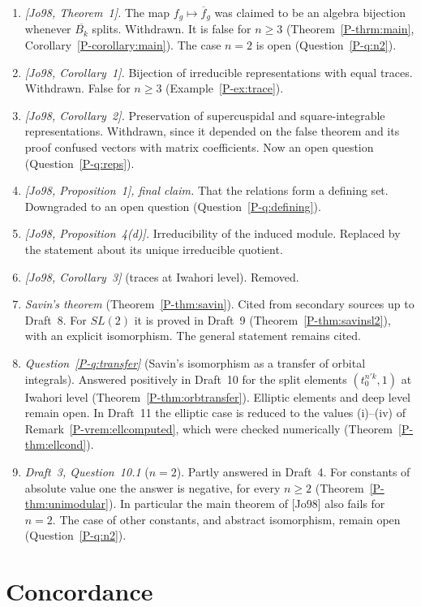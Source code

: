 \documentclass[12pt,letterpaper]{amsart}
\newcommand{\fbar}{\overline{f}}
\begin{document}
\begin{enumerate}[leftmargin=1.5em]
\item \emph{[Jo98, Theorem~1].} The map $f_g\mapsto\fbar_g$ was
claimed to be an algebra bijection whenever $\overline{B_k}$ splits.
Withdrawn. It is false for $n\geq 3$
(Theorem~\ref{P-thrm:main}, Corollary~\ref{P-corollary:main}). The case
$n=2$ is open (Question~\ref{P-q:n2}).
\item \emph{[Jo98, Corollary~1].} Bijection of irreducible
representations with equal traces. Withdrawn. False for $n\geq 3$
(Example~\ref{P-ex:trace}).
\item \emph{[Jo98, Corollary~2].} Preservation of supercuspidal and
square-integrable representations. Withdrawn, since it depended on the
false theorem and its proof confused vectors with matrix coefficients.
Now an open question (Question~\ref{P-q:reps}).
\item \emph{[Jo98, Proposition~1], final claim.} That the relations
form a defining set. Downgraded to an open question
(Question~\ref{P-q:defining}).
\item \emph{[Jo98, Proposition~4(d)].} Irreducibility of the induced
module. Replaced by the statement about its unique irreducible
quotient.
\item \emph{[Jo98, Corollary~3]} (traces at Iwahori level). Removed.
\item \emph{Savin's theorem} (Theorem~\ref{P-thm:savin}). Cited from
secondary sources up to Draft~8. For $SL(2)$ it is proved in Draft~9
(Theorem~\ref{P-thm:savinsl2}), with an explicit isomorphism. The
general statement remains cited.
\item \emph{Question~\ref{P-q:transfer}} (Savin's isomorphism as a
transfer of orbital integrals). Answered positively in Draft~10 for the
split elements $(t_0^{n'k},1)$ at Iwahori level
(Theorem~\ref{P-thm:orbtransfer}). Elliptic elements and deep level
remain open. In Draft~11 the elliptic case is reduced to the values
(i)--(iv) of Remark~\ref{P-vrem:ellcomputed}, which were checked
numerically (Theorem~\ref{P-thm:ellcond}).
\item \emph{Draft~3, Question~10.1} ($n=2$). Partly answered in
Draft~4. For constants of absolute value one the answer is negative,
for every $n\geq 2$ (Theorem~\ref{P-thm:unimodular}). In particular
the main theorem of [Jo98] also fails for $n=2$. The case of other
constants, and abstract isomorphism, remain open
(Question~\ref{P-q:n2}).
\end{enumerate}

\section{Concordance}
\end{document}
